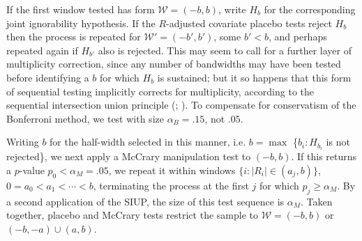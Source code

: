 If the first window tested has form $\mathcal{W} = (-b, b)$,
write $H_{b}$ for the corresponding joint ignorability hypothesis.
If the $R$-adjusted covariate placebo tests reject $H_{b}$ then the process is repeated for
$\mathcal{W}' = (-b', b')$, some
$b' < b$, and perhaps repeated again if $H_{b'}$ also is rejected.
This may seem to call for a further layer of multiplicity correction,
since any number of
bandwidths may have been tested before identifying a
$b$ for which $H_{b}$ is sustained; but it so happens that this form
of sequential testing implicitly corrects for multiplicity, according to the
sequential intersection union principle
(\citealp[SIUP;][Proposition~1]{rosenbaum2008testing};
\citealp{hansenSales2015cochran}). To compensate for conservatism of
the Bonferroni method, we test with size
$\alpha_{B}=.15$, not $.05$.

Writing $b$ for the half-width selected in this manner, i.e. $b=\max$
\{$b_{i}: H_{b_{i}}$ is not rejected\}, we next apply a McCrary
manipulation test to $(-b,b)$.  If this returns a $p$-value
$p_{0} < \alpha_{M}=.05$, we repeat it within windows
$\{ i: |R_{i}| \in (a_{j}, b)\}$, $0 = a_{0} < a_{1}< \cdots < b$,
terminating the process at the first $j$ for which
$p_{j} \geq \alpha_{M}$.  By a second application of the SIUP,
the size of this test sequence is $\alpha_{M}$.  Taken
together, placebo and McCrary tests restrict the sample to
$\mathcal{W} = (-b, b)$ or  $(-b, -a) \cup (a, b)$.


